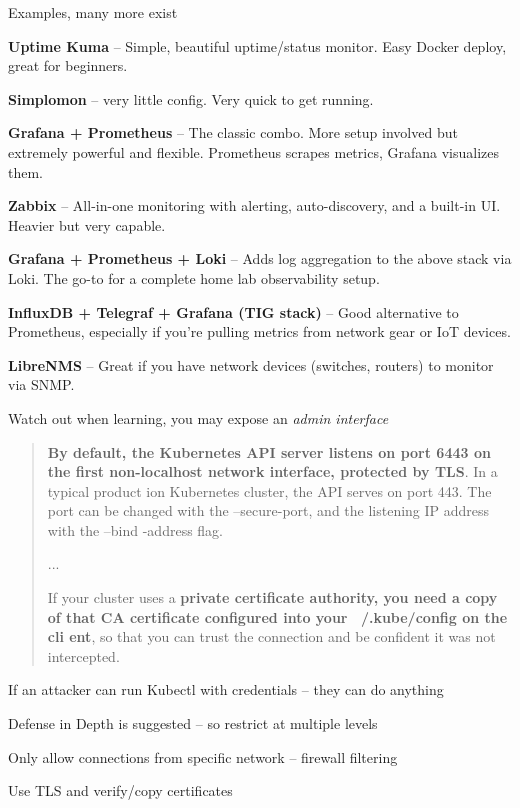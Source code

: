 \documentclass[Screen16to9,17pt]{foils}
\begin{document}
Examples, many more exist
\begin{list2}
  \item {\bf Uptime Kuma} -- Simple, beautiful uptime/status monitor. Easy Docker deploy, great for beginners.
  \item {\bf Simplomon} --  very little config. Very quick to get running.
  \item {\bf Grafana + Prometheus} -- The classic combo. More setup involved but extremely powerful and flexible. Prometheus scrapes metrics, Grafana visualizes them.
  \item {\bf Zabbix} -- All-in-one monitoring with alerting, auto-discovery, and a built-in UI. Heavier but very capable.
  \item {\bf Grafana + Prometheus + Loki} -- Adds log aggregation to the above stack via Loki. The go-to for a complete home lab observability setup.
  \item {\bf InfluxDB + Telegraf + Grafana (TIG stack)} -- Good alternative to Prometheus, especially if you're pulling metrics from network gear or IoT devices.
  \item {\bf LibreNMS} -- Great if you have network devices (switches, routers) to monitor via SNMP.
\end{list2}



Watch out when learning, you may expose an \emph{admin interface}
\begin{quote}{\bf
By default, the Kubernetes API server listens on port 6443 on the first non-localhost network interface, protected by TLS}. In a typical product
ion Kubernetes cluster, the API serves on port 443. The port can be changed with the --secure-port, and the listening IP address with the --bind
-address flag.

...

If your cluster uses a {\bf private certificate authority, you need a copy of that CA certificate configured into your ~/.kube/config on the cli
ent}, so that you can trust the connection and be confident it was not intercepted.
\end{quote}

\begin{list2}
\item If an attacker can run Kubectl with credentials -- they can do anything
\item Defense in Depth is suggested -- so restrict at multiple levels
\item Only allow connections from specific network -- firewall filtering
\item Use TLS and verify/copy certificates
\end{list2}
\end{document}

